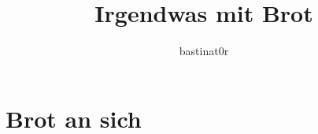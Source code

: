 \documentclass{book}
\title{Irgendwas mit Brot}
\author{bastinat0r}
\begin{document}
\maketitle

\chapter{Brot an sich}
\end{document}
